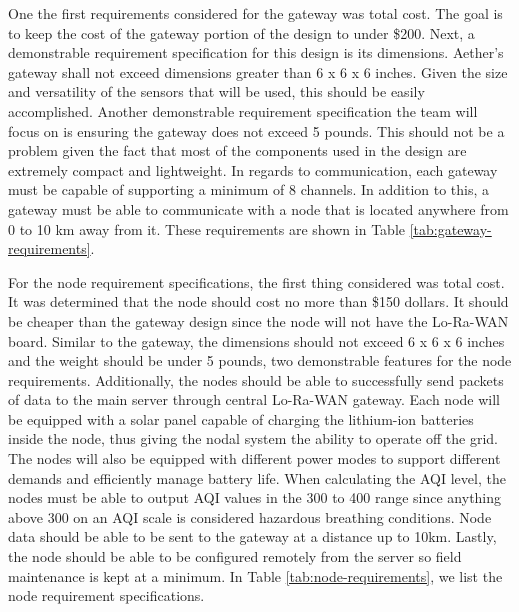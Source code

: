 One the first requirements considered for the gateway was total cost. The goal is to keep the cost of the gateway portion of the design to under \$200. Next, a demonstrable requirement specification for this design is its dimensions. Aether’s gateway shall not exceed dimensions greater than 6 x 6 x 6 inches. Given the size and versatility of the sensors that will be used, this should be easily accomplished. Another demonstrable requirement specification the team will focus on is ensuring the gateway does not exceed 5 pounds. This should not be a problem given the fact that most of the components used in the design are extremely compact and lightweight. In regards to communication, each gateway must be capable of supporting a minimum of 8 channels. In addition to this, a gateway must be able to communicate with a node that is located anywhere from 0 to 10 km away from it. These requirements are shown in Table \ref{tab:gateway-requirements}.

For the node requirement specifications, the first thing considered was total cost. It was determined that the node should cost no more than \$150 dollars. It should be cheaper than the gateway design since the node will not have the Lo-Ra-WAN board. Similar to the gateway, the dimensions should not exceed 6 x 6 x 6 inches and the weight should be under 5 pounds, two demonstrable features for the node requirements. Additionally, the nodes should be able to successfully send packets of data to the main server through central Lo-Ra-WAN gateway. Each node will be equipped with a solar panel capable of charging the lithium-ion batteries inside the node, thus giving the nodal system the ability to operate off the grid. The nodes will also be equipped with different power modes to support different demands and efficiently manage battery life. When calculating the AQI level, the nodes must be able to output AQI values in the 300 to 400 range since anything above 300 on an AQI scale is considered hazardous breathing conditions. Node data should be able to be sent to the gateway at a distance up to 10km. Lastly, the node should be able to be configured remotely from the server so field maintenance is kept at a minimum. In Table \ref{tab:node-requirements}, we list the node requirement specifications.  


